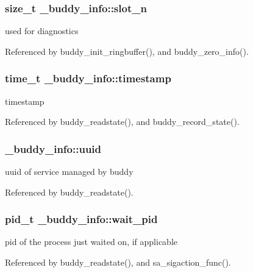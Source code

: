 \subsubsection[{slot\_\-n}]{\setlength{\rightskip}{0pt plus 5cm}size\_\-t {\bf \_\-buddy\_\-info::slot\_\-n}}\label{struct__buddy__info_aea38b50c414cf38d926ffe579e6449db}
used for diagnostics 

Referenced by buddy\_\-init\_\-ringbuffer(), and buddy\_\-zero\_\-info().

\subsubsection[{timestamp}]{\setlength{\rightskip}{0pt plus 5cm}time\_\-t {\bf \_\-buddy\_\-info::timestamp}}\label{struct__buddy__info_ab7990ca27beae47735ee8cbf3376c3d7}
timestamp 

Referenced by buddy\_\-readstate(), and buddy\_\-record\_\-state().

\subsubsection[{uuid}]{ {\bf \_\-buddy\_\-info::uuid}}\label{struct__buddy__info_a677c1a945cf4e2571cdd29b7ae822439}
uuid of service managed by buddy 

Referenced by buddy\_\-readstate().

\subsubsection[{wait\_\-pid}]{\setlength{\rightskip}{0pt plus 5cm}pid\_\-t {\bf \_\-buddy\_\-info::wait\_\-pid}}\label{struct__buddy__info_af7057b15fc51781ce0bb63d717d59e2a}
pid of the process just waited on, if applicable 

Referenced by buddy\_\-readstate(), and sa\_\-sigaction\_\-func().

